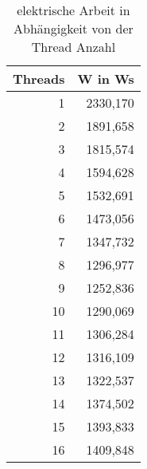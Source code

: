 \begin{table}[htbp]
  \centering
  \caption{elektrische Arbeit in Abhängigkeit von der Thread Anzahl}
    \begin{tabular}{rr}
    \toprule
    \multicolumn{1}{c}{Threads} & \multicolumn{1}{c}{W in Ws} \\
    \midrule
    1     & 2330,170 \\
    \midrule
    2     & 1891,658 \\
    \midrule
    3     & 1815,574 \\
    \midrule
    4     & 1594,628 \\
    \midrule
    5     & 1532,691 \\
    \midrule
    6     & 1473,056 \\
    \midrule
    7     & 1347,732 \\
    \midrule
    8     & 1296,977 \\
    \midrule
    9     & 1252,836 \\
    \midrule
    10    & 1290,069 \\
    \midrule
    11    & 1306,284 \\
    \midrule
    12    & 1316,109 \\
    \midrule
    13    & 1322,537 \\
    \midrule
    14    & 1374,502 \\
    \midrule
    15    & 1393,833 \\
    \midrule
    16    & 1409,848 \\
    \bottomrule
    \end{tabular}%
  \label{tab:Base64Arbeit}%
\end{table}%
